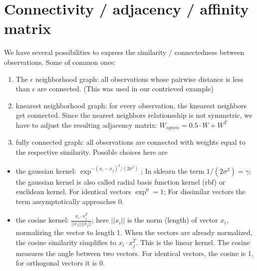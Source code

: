 \documentclass[letterpaper,10pt,english]{jupyterBook}
\begin{document}
\section{Connectivity / adjacency / affinity matrix}
\label{\detokenize{Text_Clustering:connectivity-adjacency-affinity-matrix}}
\sphinxAtStartPar
We have several possibilities to express the similarity / connectedness between observations. Some of common ones:
\begin{enumerate}
%
\item {} 
\sphinxAtStartPar
The \(\epsilon\) neighborhood graph: all observations whose pairwise distance is less than \(\epsilon\) are connected. (This was used in our contrieved example)

\item {} 
\sphinxAtStartPar
k\sphinxhyphen{}nearest neighborhood graph: for every observation, the k\sphinxhyphen{}nearest neighbors get connected. Since the nearest neighbors relationsship is not symmetric, we have to adjust the resulting adjacency matrix: \(W_{symm} = 0.5 \cdot W + W^{T}\)

\item {} 
\sphinxAtStartPar
fully connected graph: all observations are connected with weights equal to the respective similarity. Possible choices here are

\end{enumerate}
\begin{itemize}
\item {} 
\sphinxAtStartPar
the gaussian kernel: \(\exp^{-(x_i - x_j)^2/(2\sigma^2)}\); In sklearn the term \(1/(2\sigma^2) = \gamma\); the gaussian kernel is also called radial basis function kernel (rbf) or euclidean kernel. For identical vectors \(\exp^{0} = 1\); For dissimilar vectors the term assymptotically approaches 0.

\item {} 
\sphinxAtStartPar
the cosine kernel: \(\frac{x_i \cdot x_j^T}{||x_i|| ||x_j||}\); here \(||x_i||\) is the norm (length) of vector \(x_i\), normalizing the vector to length 1. When the vectors are already normalized, the cosine similarity simplifies to \(x_i \cdot x_j^T\). This is the linear kernel. The cosine measures the angle between two vectors. For identical vectors, the cosine is 1, for orthogonal vectors it is 0.

\end{itemize}
\end{document}
